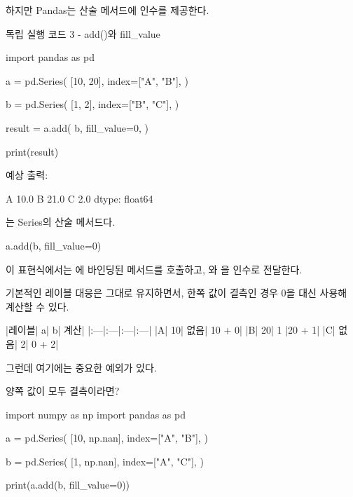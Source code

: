 하지만 Pandas는 산술 메서드에  인수를 제공한다.

\begin{dhknote}
\begin{dhksmry}[centered]
독립 실행 코드 3 - add()와 fill_value
\end{dhksmry}
\end{dhknote}

\begin{dhkcode}
import pandas as pd

a = pd.Series(
    [10, 20],
    index=["A", "B"],
)

b = pd.Series(
    [1, 2],
    index=["B", "C"],
)

result = a.add(
    b,
    fill_value=0,
)

print(result)
\end{dhkcode}

예상 출력:

\begin{dhkzsh}
A    10.0
B    21.0
C     2.0
dtype: float64
\end{dhkzsh}

는 Series의 산술 메서드다.

\begin{dhkcode}
a.add(b, fill_value=0)
\end{dhkcode}

이 표현식에서는 에 바인딩된 메서드를 호출하고, 와 을 인수로 전달한다.

기본적인 레이블 대응은 그대로 유지하면서, 한쪽 값이 결측인 경우 0을 대신 사용해 계산할 수 있다.

\begin{dhktable}
|레이블|	a|	b|	계산|
|:---|:---|:---|:---|
|A|	10|	없음|	10 + 0|
|B|	20|	1	|20 + 1|
|C|	없음|	2|	0 + 2|
\end{dhktable}

그런데 여기에는 중요한 예외가 있다.

\begin{dhknote}
\begin{dhksmry}[centered]
양쪽 값이 모두 결측이라면?
\end{dhksmry}
\end{dhknote}

\begin{dhkcode}
import numpy as np
import pandas as pd

a = pd.Series(
    [10, np.nan],
    index=["A", "B"],
)

b = pd.Series(
    [1, np.nan],
    index=["A", "C"],
)

print(a.add(b, fill_value=0))
\end{dhkcode}

